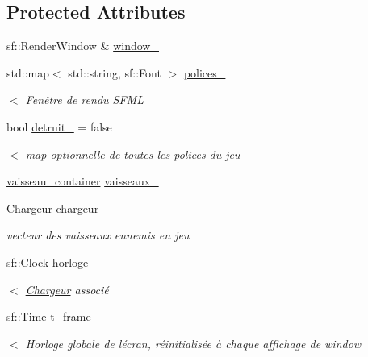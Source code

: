 \subsection*{Protected Attributes}
\begin{DoxyCompactItemize}
\item 
sf\+::\+Render\+Window \& \mbox{\hyperlink{class_ecran_a2c5cede2731636193a4a70048ab5fdbb}{window\+\_\+}}
\item 
std\+::map$<$ std\+::string, sf\+::\+Font $>$ \mbox{\hyperlink{class_ecran_a180354db08d7f975536cc1cb05f18cb1}{polices\+\_\+}}
\begin{DoxyCompactList}\small\item\em $<$ Fenêtre de rendu S\+F\+ML \end{DoxyCompactList}\item 
bool \mbox{\hyperlink{class_ecran_a0a1c7e8dd7bea72c322b910d33667be8}{detruit\+\_\+}} = false
\begin{DoxyCompactList}\small\item\em $<$ map optionnelle de toutes les polices du jeu \end{DoxyCompactList}\item 
\mbox{\hyperlink{def__type_8h_ad123ed7c93f42c8dd68e4af28b16b639}{vaisseau\+\_\+container}} \mbox{\hyperlink{class_ecran_a306123479f6a6b688ad13b5b4ca69de7}{vaisseaux\+\_\+}}
\item 
\mbox{\hyperlink{class_chargeur}{Chargeur}} \mbox{\hyperlink{class_ecran_a0ae817b129b8dab74f33bf2a1bf05cc5}{chargeur\+\_\+}}
\begin{DoxyCompactList}\small\item\em vecteur des vaisseaux ennemis en jeu \end{DoxyCompactList}\item 
sf\+::\+Clock \mbox{\hyperlink{class_ecran_ac31400b0f55cd0892516edf787dc1751}{horloge\+\_\+}}
\begin{DoxyCompactList}\small\item\em $<$ \mbox{\hyperlink{class_chargeur}{Chargeur}} associé \end{DoxyCompactList}\item 
sf\+::\+Time \mbox{\hyperlink{class_ecran_aefbd6654c88f1014dadbb04f27243cae}{t\+\_\+frame\+\_\+}}
\begin{DoxyCompactList}\small\item\em $<$ Horloge globale de l\textquotesingle{}écran, réinitialisée à chaque affichage de window \end{DoxyCompactList}\end{DoxyCompactItemize}


